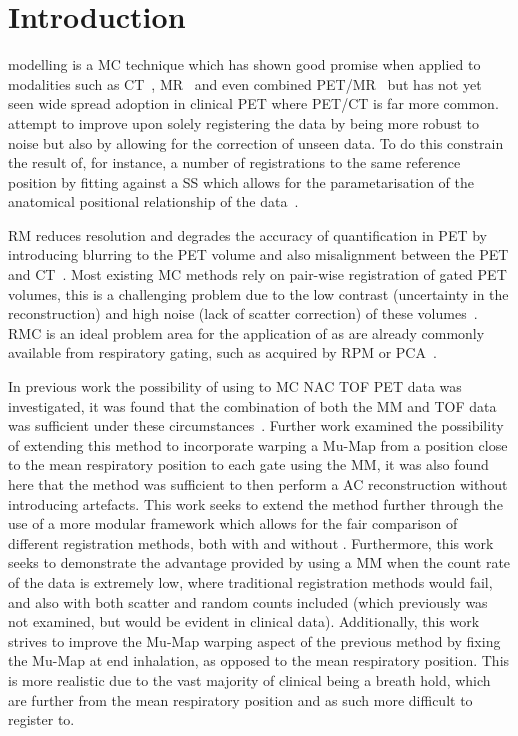 \section{Introduction} \label{sec:introduction}
     modelling is a \gls{MC} technique which has shown good promise when applied to modalities such as \gls{CT}~\cite{Li2007EnhancedModel}, \gls{MR}~\cite{Manke2002RespiratoryModels} and even combined \gls{PET}/\gls{MR}~\cite{Manber2016JointCorrection.} but has not yet seen wide spread adoption in clinical \gls{PET} where \gls{PET}/\gls{CT} is far more common.  attempt to improve upon solely registering the data by being more robust to noise but also by allowing for the correction of unseen data. To do this  constrain the result of, for instance, a number of registrations to the same reference position by fitting against a \gls{SS} which allows for the parametarisation of the anatomical positional relationship of the data~\cite{McClelland2013}.
    
    \gls{RM} reduces resolution and degrades the accuracy of quantification in \gls{PET} by introducing blurring to the \gls{PET} volume and also misalignment between the \gls{PET} and \gls{CT}~\cite{Nehmeh2008a}. Most existing \gls{MC} methods rely on pair-wise registration of gated \gls{PET} volumes, this is a challenging problem due to the low contrast (uncertainty in the reconstruction) and high noise (lack of scatter correction) of these volumes~\cite{Oliveira2014}. \gls{RMC} is an ideal problem area for the application of  as  are already commonly available from respiratory gating, such as acquired by \gls{RPM} or \gls{PCA}~\cite{Thielemans2011}.
    
    In previous work the possibility of using  to \gls{MC} \gls{NAC} \gls{TOF} \gls{PET} data was investigated, it was found that the combination of both the \gls{MM} and \gls{TOF} data was sufficient under these circumstances~\cite{Whitehead2019ImpactPET}. Further work examined the possibility of extending this method to incorporate warping a \gls{Mu-Map} from a position close to the mean respiratory position to each gate using the \gls{MM}, it was also found here that the method was sufficient to then perform a \gls{AC} reconstruction without introducing artefacts. This work seeks to extend the method further through the use of a more modular framework which allows for the fair comparison of different registration methods, both with and without . Furthermore, this work seeks to demonstrate the advantage provided by using a \gls{MM} when the count rate of the data is extremely low, where traditional registration methods would fail, and also with both scatter and random counts included (which previously was not examined, but would be evident in clinical data). Additionally, this work strives to improve the \gls{Mu-Map} warping aspect of the previous method by fixing the \gls{Mu-Map} at end inhalation, as opposed to the mean respiratory position. This is more realistic due to the vast majority of clinical  being a breath hold, which are further from the mean respiratory position and as such more difficult to register to.

